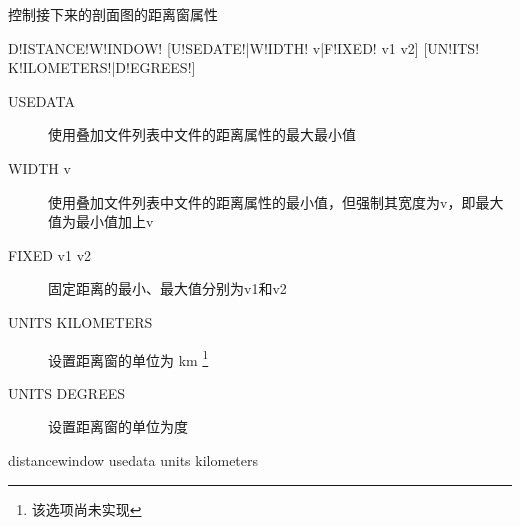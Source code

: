 \label{sss:distancewindow}

控制接下来的剖面图的距离窗属性

\begin{SACSTX}
D!ISTANCE!W!INDOW! [U!SEDATE!|W!IDTH! v|F!IXED! v1 v2] [UN!ITS! K!ILOMETERS!|D!EGREES!]
\end{SACSTX}

\begin{description}
\item [USEDATA] 使用叠加文件列表中文件的距离属性的最大最小值
\item [WIDTH v] 使用叠加文件列表中文件的距离属性的最小值，但强制其宽度为v，即最大值为最小值加上v
\item [FIXED v1 v2] 固定距离的最小、最大值分别为v1和v2
\item [UNITS KILOMETERS] 设置距离窗的单位为 \si{\km} \footnote{该选项尚未实现}
\item [UNITS DEGREES] 设置距离窗的单位为度
\end{description}

\begin{SACDFT}
distancewindow usedata units kilometers
\end{SACDFT}
